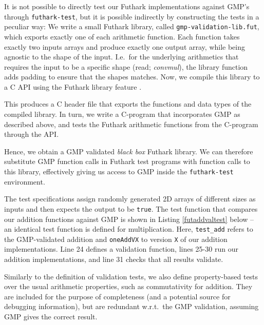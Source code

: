 It is not possible to directly test our Futhark implementations against GMP's
through \texttt{futhark-test}, but it is possible indirectly by constructing the
tests in a peculiar way: We write a small Futhark library, called
\texttt{gmp-validation-lib.fut}, which exports exactly one of each arithmetic
function. Each function takes exactly two inputs arrays and produce exactly one
output array, while being agnostic to the shape of the input. I.e.\ for the
underlying arithmetics that requires the input to be a specific shape (read;
\textit{convmul}), the library function adds padding to ensure that the shapes
matches. Now, we compile this library to a C API using the Futhark library
feature \cite{futguide}.

This produces a C header file that exports the functions and data types of the
compiled library. In turn, we write a C-program that incorporates GMP as
described above, and tests the Futhark arithmetic functions from the C-program
through the API.

Hence, we obtain a GMP validated \textit{black box} Futhark library. We can
therefore substitute GMP function calls in Futhark test programs with function
calls to this library, effectively giving us access to GMP inside the
\texttt{futhark-test} environment.

The test specifications assign randomly generated 2D arrays of different sizes
as inputs and then expects the output to be \texttt{true}. The test function
that compares our addition functions against GMP is shown in Listing
\ref{futaddvaltest} below -- an identical test function is defined for
multiplication. Here, \texttt{test\_add} refers to the GMP-validated addition
and \texttt{oneAddVX} to version \texttt{X} of our addition
implementations. Line 24 defines a validation function, lines 25-30 run our
addition implementations, and line 31 checks that all results validate.



Similarly to the definition of validation tests, we also define property-based
tests over the usual arithmetic properties, such as commutativity for
addition. They are included for the purpose of completeness (and a potential
source for debugging information), but are redundant w.r.t.\ the GMP validation,
assuming GMP gives the correct result.

